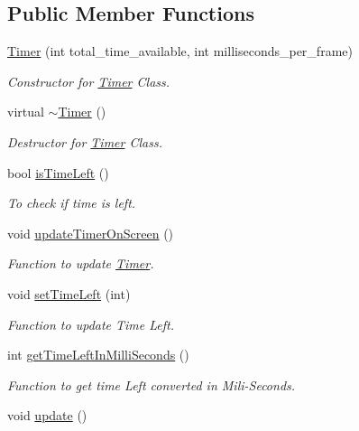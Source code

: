 \subsection*{Public Member Functions}
\begin{DoxyCompactItemize}
\item 
\hyperlink{classTimer_a58988682da3ca1b076605faa4d97415f}{Timer} (int total\-\_\-time\-\_\-available, int milliseconds\-\_\-per\-\_\-frame)
\begin{DoxyCompactList}\small\item\em Constructor for \hyperlink{classTimer}{Timer} Class. \end{DoxyCompactList}\item 
\hypertarget{classTimer_ad3c95ce902fce977d280256256856d64}{virtual \hyperlink{classTimer_ad3c95ce902fce977d280256256856d64}{$\sim$\-Timer} ()}\label{classTimer_ad3c95ce902fce977d280256256856d64}

\begin{DoxyCompactList}\small\item\em Destructor for \hyperlink{classTimer}{Timer} Class. \end{DoxyCompactList}\item 
bool \hyperlink{classTimer_a953317a04cb8e28d24ef0f12220db90f}{is\-Time\-Left} ()
\begin{DoxyCompactList}\small\item\em To check if time is left. \end{DoxyCompactList}\item 
\hypertarget{classTimer_af4ace519cf8f0d4acd8de4ed261d43fb}{void \hyperlink{classTimer_af4ace519cf8f0d4acd8de4ed261d43fb}{update\-Timer\-On\-Screen} ()}\label{classTimer_af4ace519cf8f0d4acd8de4ed261d43fb}

\begin{DoxyCompactList}\small\item\em Function to update \hyperlink{classTimer}{Timer}. \end{DoxyCompactList}\item 
\hypertarget{classTimer_a474769bcd9d27df82bb9d6e440207f67}{void \hyperlink{classTimer_a474769bcd9d27df82bb9d6e440207f67}{set\-Time\-Left} (int)}\label{classTimer_a474769bcd9d27df82bb9d6e440207f67}

\begin{DoxyCompactList}\small\item\em Function to update Time Left. \end{DoxyCompactList}\item 
int \hyperlink{classTimer_a528e5f3b77971b8d99a81fbcff1aa018}{get\-Time\-Left\-In\-Milli\-Seconds} ()
\begin{DoxyCompactList}\small\item\em Function to get time Left converted in Mili-\/\-Seconds. \end{DoxyCompactList}\item 
\hypertarget{classTimer_a745ad59b5a46744cd871a1129a25d74f}{void \hyperlink{classTimer_a745ad59b5a46744cd871a1129a25d74f}{update} ()}\label{classTimer_a745ad59b5a46744cd871a1129a25d74f}


\end{DoxyCompactItemize}
